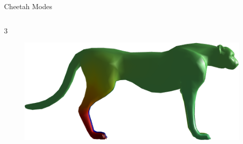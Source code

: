 \documentclass{beamer}
\begin{document}
\begin{frame}{Cheetah Modes}
\begin{columns}
\begin{column}[T]{5cm}
\begin{figure}[t]
\end{figure}
3
\begin{figure}[t]
    \includegraphics[width=\textwidth]{Harmonics/CheetahModes/3.png}
\end{figure}
\end{column}
\end{columns}

\end{frame}
\end{document}
